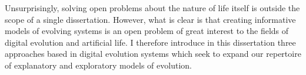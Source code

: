 Unsurprisingly, solving open problems about the nature of life itself is outside the scope of a single dissertation. 
However, what is clear is that creating informative models of evolving systems is an open problem of great interest to the fields of digital evolution and artificial life. 
I therefore introduce in this dissertation three approaches based in digital evolution systems which seek to expand our repertoire of explanatory and exploratory models of evolution.